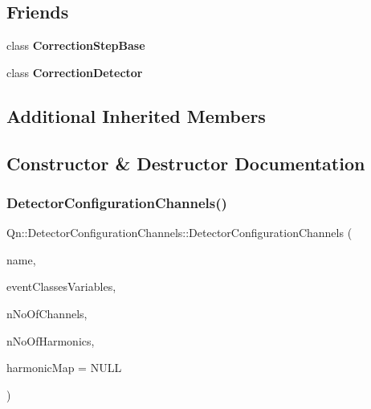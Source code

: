 \subsection*{Friends}
\begin{DoxyCompactItemize}
\item 
\mbox{\label{classQn_1_1DetectorConfigurationChannels_afbb351f0a159c2e61159977b03f4b3c1}} 
class {\bfseries Correction\+Step\+Base}
\item 
\mbox{\label{classQn_1_1DetectorConfigurationChannels_aaaec1af05216df7a0fa18215ef18023b}} 
class {\bfseries Correction\+Detector}
\end{DoxyCompactItemize}
\subsection*{Additional Inherited Members}


\subsection{Constructor \& Destructor Documentation}
\mbox{\label{classQn_1_1DetectorConfigurationChannels_a317ef35a90228d567c1ba612476e6730}} 
\subsubsection{\texorpdfstring{Detector\+Configuration\+Channels()}{DetectorConfigurationChannels()}}
{\footnotesize\ttfamily Qn\+::\+Detector\+Configuration\+Channels\+::\+Detector\+Configuration\+Channels (\begin{DoxyParamCaption}\item[{const char $\ast$}]{name,  }\item[{\mbox{\hyperlink{classQn_1_1EventClassVariablesSet}{Event\+Class\+Variables\+Set}} $\ast$}]{event\+Classes\+Variables,  }\item[{Int\+\_\+t}]{n\+No\+Of\+Channels,  }\item[{Int\+\_\+t}]{n\+No\+Of\+Harmonics,  }\item[{Int\+\_\+t $\ast$}]{harmonic\+Map = {\ttfamily NULL} }\end{DoxyParamCaption})}

